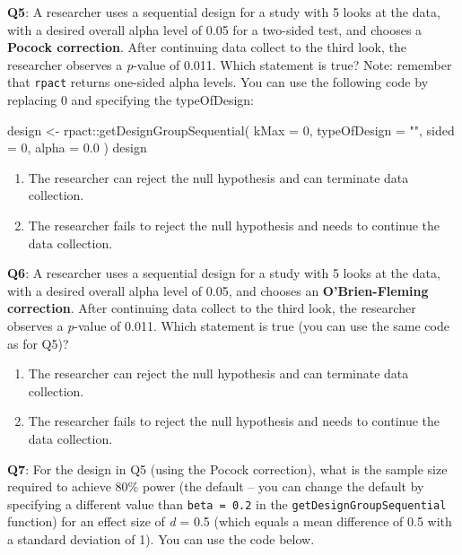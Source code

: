\documentclass[
  oneside]{book}
\newenvironment{Shaded}{\begin{snugshade}}{\end{snugshade}}
\newcommand{\AttributeTok}[1]{\textcolor[rgb]{0.77,0.63,0.00}{#1}}
\newcommand{\DecValTok}[1]{\textcolor[rgb]{0.00,0.00,0.81}{#1}}
\newcommand{\FloatTok}[1]{\textcolor[rgb]{0.00,0.00,0.81}{#1}}
\newcommand{\FunctionTok}[1]{\textcolor[rgb]{0.00,0.00,0.00}{#1}}
\newcommand{\NormalTok}[1]{#1}
\newcommand{\OtherTok}[1]{\textcolor[rgb]{0.56,0.35,0.01}{#1}}
\newcommand{\SpecialCharTok}[1]{\textcolor[rgb]{0.00,0.00,0.00}{#1}}
\newcommand{\StringTok}[1]{\textcolor[rgb]{0.31,0.60,0.02}{#1}}
\providecommand{\tightlist}{%
  \setlength{\itemsep}{0pt}\setlength{\parskip}{0pt}}
\begin{document}
\textbf{Q5}: A researcher uses a sequential design for a study with 5 looks at the data, with a desired overall alpha level of 0.05 for a two-sided test, and chooses a \textbf{Pocock correction}. After continuing data collect to the third look, the researcher observes a \emph{p}-value of 0.011. Which statement is true? Note: remember that \texttt{rpact} returns one-sided alpha levels. You can use the following code by replacing 0 and specifying the typeOfDesign:

\begin{Shaded}
\begin{Highlighting}[]
\NormalTok{design }\OtherTok{\textless{}{-}}\NormalTok{ rpact}\SpecialCharTok{::}\FunctionTok{getDesignGroupSequential}\NormalTok{(}
  \AttributeTok{kMax =} \DecValTok{0}\NormalTok{,}
  \AttributeTok{typeOfDesign =} \StringTok{""}\NormalTok{,}
  \AttributeTok{sided =} \DecValTok{0}\NormalTok{,}
  \AttributeTok{alpha =} \FloatTok{0.0}
\NormalTok{)}
\NormalTok{design}
\end{Highlighting}
\end{Shaded}

\begin{enumerate}
\def\labelenumi{\Alph{enumi})}
\tightlist
\item
  The researcher can reject the null hypothesis and can terminate data collection.
\item
  The researcher fails to reject the null hypothesis and needs to continue the data collection.
\end{enumerate}

\textbf{Q6}: A researcher uses a sequential design for a study with 5 looks at the data, with a desired overall alpha level of 0.05, and chooses an \textbf{O'Brien-Fleming correction}. After continuing data collect to the third look, the researcher observes a \emph{p}-value of 0.011. Which statement is true (you can use the same code as for Q5)?

\begin{enumerate}
\def\labelenumi{\Alph{enumi})}
\tightlist
\item
  The researcher can reject the null hypothesis and can terminate data collection.
\item
  The researcher fails to reject the null hypothesis and needs to continue the data collection.
\end{enumerate}

\textbf{Q7}: For the design in Q5 (using the Pocock correction), what is the sample size required to achieve 80\% power (the default -- you can change the default by specifying a different value than \texttt{beta\ =\ 0.2} in the \texttt{getDesignGroupSequential} function) for an effect size of \emph{d} = 0.5 (which equals a mean difference of 0.5 with a standard deviation of 1). You can use the code below.
\end{document}
